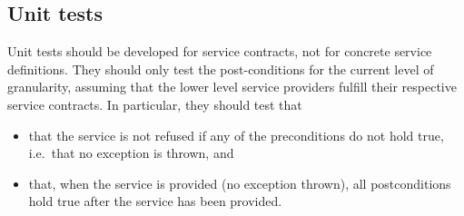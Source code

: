 \subsection{Unit tests}

Unit tests should be developed for service contracts, not for concrete service definitions. They should only test the post-conditions for the current level of granularity, assuming that the lower level service providers fulfill their respective service contracts. In particular, they should test that
\begin{itemize}
  \item that the service is not refused if any of the preconditions do not hold true, i.e.\ that no exception is thrown, and
  \item that, when the service is provided (no exception thrown), all postconditions hold true after the service has been provided.
\end{itemize}

